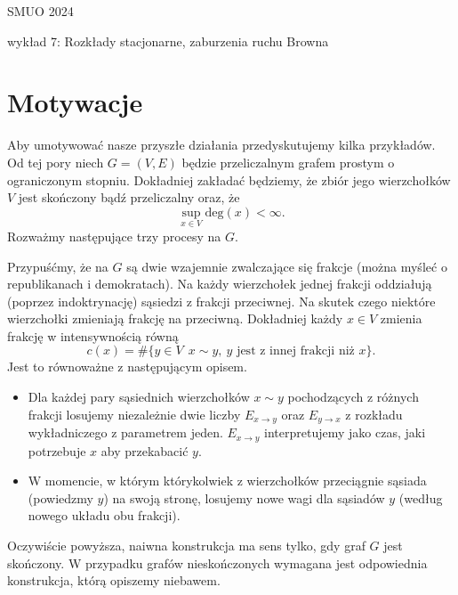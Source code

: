 \documentclass{article}
\begin{document}
SMUO 2024

wykład 7: Rozkłady stacjonarne, zaburzenia ruchu Browna

\section{Motywacje}

Aby umotywować nasze przyszłe działania przedyskutujemy kilka przykładów. 
Od tej pory niech $G =(V, E)$ będzie przeliczalnym grafem prostym o ograniczonym stopniu.
Dokładniej zakładać będziemy, że zbiór jego wierzchołków $V$ jest skończony bądź przeliczalny 
oraz, że
\begin{equation*}
	\sup_{x \in V} \mathrm{deg}(x) <\infty.
\end{equation*}
Rozważmy następujące trzy procesy na $G$.

\begin{pd}
	Przypuśćmy, że na $G$ są dwie wzajemnie zwalczające się frakcje (można myśleć o republikanach 
	i demokratach). Na każdy wierzchołek jednej frakcji oddziałują (poprzez indoktrynację) 
	sąsiedzi z frakcji przeciwnej. Na skutek czego niektóre wierzchołki zmieniają frakcję
	na przeciwną.
	Dokładniej każdy $x \in V$ zmienia frakcję w intensywnością równą
	\begin{equation*}
		c(x) = \# \{ y \in V \: \: x \sim y, \: \mbox{$y$ jest z innej frakcji niż $x$} \}.
	\end{equation*}
	Jest to równoważne z następującym opisem.
	\begin{itemize}
		\item Dla każdej pary sąsiednich wierzchołków $x\sim y$ pochodzących z różnych 
			frakcji losujemy niezależnie dwie liczby $E_{x\to y}$ oraz $E_{y\to x}$
			z rozkładu wykładniczego z parametrem jeden. $E_{x\to y}$ interpretujemy
			jako czas, jaki potrzebuje $x$ aby przekabacić $y$.
		\item W momencie, w którym którykolwiek z wierzchołków przeciągnie sąsiada 
			(powiedzmy $y$)
			na swoją stronę, losujemy nowe wagi dla sąsiadów $y$ (według nowego 
			układu obu frakcji).
	\end{itemize}
	Oczywiście powyższa, naiwna konstrukcja ma sens tylko, gdy graf $G$ jest skończony. 
	W przypadku grafów nieskończonych wymagana jest odpowiednia konstrukcja, którą opiszemy
	niebawem.
\end{pd}
\end{document}

